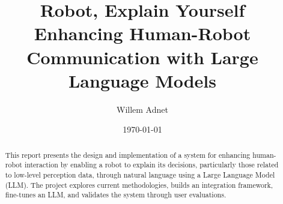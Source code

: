 \documentclass[11pt,a4paper]{article}
\begin{document}
\title{Robot, Explain Yourself\\
Enhancing Human-Robot Communication with Large Language Models}
\author{Willem Adnet}
\date{\today}
\maketitle

\begin{abstract}
This report presents the design and implementation of a system for enhancing human-robot interaction by enabling a robot to explain its decisions, particularly those related to low-level perception data, through natural language using a Large Language Model (LLM).
The project explores current methodologies, builds an integration framework, fine-tunes an LLM, and validates the system through user evaluations.
\end{abstract}

\tableofcontents
\newpage











\end{document}
